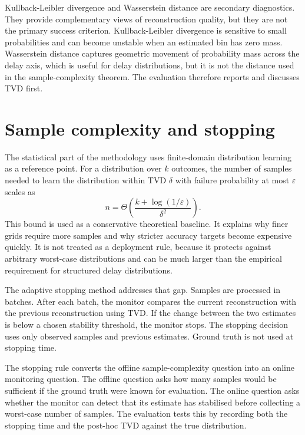 \documentclass[a4paper,11pt]{report}
\begin{document}
Kullback-Leibler divergence and Wasserstein distance are secondary diagnostics. They provide complementary views of reconstruction quality, but they are not the primary success criterion. Kullback-Leibler divergence is sensitive to small probabilities and can become unstable when an estimated bin has zero mass. Wasserstein distance captures geometric movement of probability mass across the delay axis, which is useful for delay distributions, but it is not the distance used in the sample-complexity theorem. The evaluation therefore reports and discusses TVD first.

\section{Sample complexity and stopping}
\label{sec:method-sample-complexity-stopping}

The statistical part of the methodology uses finite-domain distribution learning as a reference point. For a distribution over \(k\) outcomes, the number of samples needed to learn the distribution within TVD \(\delta\) with failure probability at most \(\varepsilon\) scales as
\[
n=\Theta\left(\frac{k+\log(1/\varepsilon)}{\delta^2}\right).
\]
This bound is used as a conservative theoretical baseline. It explains why finer grids require more samples and why stricter accuracy targets become expensive quickly. It is not treated as a deployment rule, because it protects against arbitrary worst-case distributions and can be much larger than the empirical requirement for structured delay distributions.

The adaptive stopping method addresses that gap. Samples are processed in batches. After each batch, the monitor compares the current reconstruction with the previous reconstruction using TVD. If the change between the two estimates is below a chosen stability threshold, the monitor stops. The stopping decision uses only observed samples and previous estimates. Ground truth is not used at stopping time.

The stopping rule converts the offline sample-complexity question into an online monitoring question. The offline question asks how many samples would be sufficient if the ground truth were known for evaluation. The online question asks whether the monitor can detect that its estimate has stabilised before collecting a worst-case number of samples. The evaluation tests this by recording both the stopping time and the post-hoc TVD against the true distribution.
\end{document}

